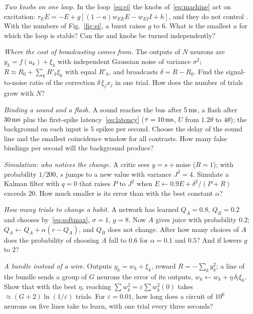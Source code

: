 \begin{exercise}[\lvlB]
\label{ex:10:2}
\emph{Two knobs on one loop.} In the loop~\eqref{eq:ei} the knobs of~\eqref{eq:machine} act on excitation: $\tau_E\dot E=-E+g[(1-a)w_{EE}E-w_{EI}I+h]$, and they do not control . With the numbers of Fig.~\ref{fig:ei}, a  burst raises $g$ to $6$. What is the smallest $a$ for which the loop is stable? Can the  and  knobs be turned independently?
\end{exercise}

\begin{exercise}[\lvlB]
\label{ex:10:3}
\emph{Where the cost of broadcasting comes from.} The outputs of $N$ neurons are $y_k=f(u_k)+\xi_k$ with independent Gaussian noise of variance $\sigma^2$; $R\approx R_0+\sum_kR'_k\xi_k$ with equal $R'_k$, and  broadcasts $\delta=R-R_0$. Find the signal-to-noise ratio of the correction $\delta\,\xi_jx_j$ in one trial. How does the number of trials grow with $N$?
\end{exercise}

\begin{exercise}[\lvlB]
\label{ex:10:4}
\emph{Binding a sound and a flash.} A sound reaches the bus after $5\,\text{ms}$, a flash after $30\,\text{ms}$ plus the first-spike latency~\eqref{eq:latency} ($\tau=10\,\text{ms}$, $U$ from $1.2\theta$ to $4\theta$); the background on each input is $5$ spikes per second. Choose the delay of the sound line and the smallest coincidence window for all contrasts. How many false bindings per second will the background produce?
\end{exercise}

\begin{exercise}[\lvlB]
\label{ex:10:5}
\emph{Simulation: who notices the change.} A critic sees $y=s+\text{noise}$ ($R=1$); with probability $1/200$, $s$ jumps to a new value with variance $J^2=4$. Simulate a Kalman filter with $q=0$ that raises $P$ to $J^2$ when $E\leftarrow0.9E+\delta^2/(P+R)$ exceeds $20$. How much smaller is its error than with the best constant $\alpha$?
\end{exercise}

\begin{exercise}[\lvlA]
\label{ex:10:6}
\emph{How many trials to change a habit.} A network has learned $Q_A=0.8$, $Q_B=0.2$ and chooses by~\eqref{eq:softmax}, $\sigma=1$, $g=8$. Now $A$ gives juice with probability $0.2$; $Q_A\leftarrow Q_A+\alpha(r-Q_A)$, and $Q_B$ does not change. After how many choices of $A$ does the probability of choosing $A$ fall to $0.6$ for $\alpha=0.1$ and $0.5$? And if  lowers $g$ to $2$?
\end{exercise}

\begin{exercise}[\lvlC]
\label{ex:10:7}
\emph{A bundle instead of a wire.} Outputs $y_k=w_k+\xi_k$, reward $R=-\sum_ky_k^2$; a line of the bundle sends a group of $G$ neurons the error of its outputs, $w_k\leftarrow w_k+\eta\,\delta_l\xi_k$. Show that with the best $\eta$, reaching $\sum w_k^2=\varepsilon\sum w_k^2(0)$ takes $\approx(G+2)\ln(1/\varepsilon)$ trials. For $\varepsilon=0.01$, how long does a circuit of $10^6$ neurons on five lines take to learn, with one trial every three seconds?
\end{exercise}

